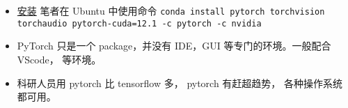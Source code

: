 

\begin{itemize}
\item \href{https://pytorch.org/get-started/locally/}{安装} 笔者在 Ubuntu 中使用命令 \verb`conda install pytorch torchvision torchaudio pytorch-cuda=12.1 -c pytorch -c nvidia`
\item PyTorch 只是一个 package，并没有 IDE，GUI 等专门的环境。一般配合 VScode， 等环境。
\item 科研人员用 pytorch 比 tensorflow 多， pytorch 有赶超趋势， 各种操作系统都可用。
\end{itemize}

